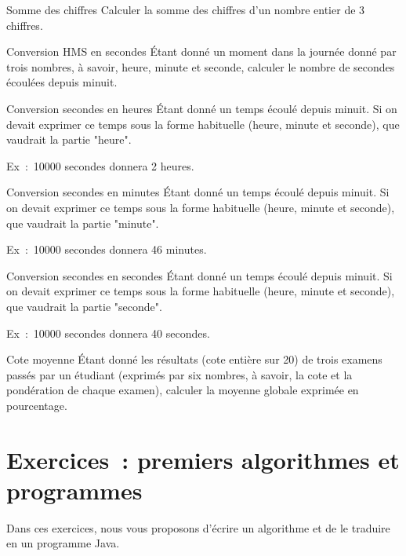 \begin{Exercice}{Somme des chiffres}
	Calculer la somme des chiffres
	d’un nombre entier de 3 chiffres.
\end{Exercice}

\begin{Exercice}{Conversion HMS en secondes}
	Étant donné un moment dans la journée donné
	par trois nombres, à savoir, heure, minute et seconde, calculer le
	nombre de secondes écoulées depuis minuit.
\end{Exercice}

\begin{Exercice}{Conversion secondes en heures}
	Étant donné un temps écoulé depuis minuit.
	Si on devait exprimer ce temps sous la forme
	habituelle (heure, minute et seconde),
	que vaudrait la partie "heure".

	Ex~:~10000 secondes donnera 2 heures.
\end{Exercice}

\begin{Exercice}{Conversion secondes en minutes}
	Étant donné un temps écoulé depuis minuit.
	Si on devait exprimer ce temps sous la forme
	habituelle (heure, minute et seconde),
	que vaudrait la partie "minute".

	Ex~:~10000 secondes donnera 46 minutes.
\end{Exercice}

\begin{Exercice}{Conversion secondes en secondes}
	Étant donné un temps écoulé depuis minuit.
	Si on devait exprimer ce temps sous la forme
	habituelle (heure, minute et seconde),
	que vaudrait la partie "seconde".

	Ex~:~10000 secondes donnera 40 secondes.
\end{Exercice}	

\begin{Exercice}{Cote moyenne}
	Étant donné les résultats (cote entière sur
	20) de trois examens passés par un étudiant (exprimés par six nombres,
	à savoir, la cote et la pondération de chaque examen), calculer 
	la moyenne globale exprimée en pourcentage.
\end{Exercice}



\section{Exercices~: premiers algorithmes et programmes}
\label{prem-ex-simple}

Dans ces exercices, nous vous proposons d'écrire un algorithme et de le traduire
en un programme Java. 

